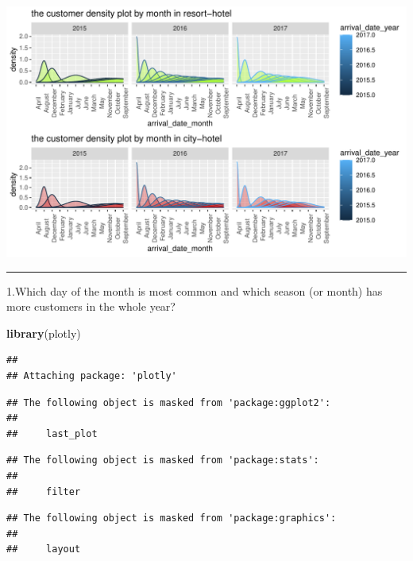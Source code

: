 \documentclass[11pt,a4paper,]{article}
\newenvironment{Shaded}{\begin{snugshade}}{\end{snugshade}}
\newcommand{\KeywordTok}[1]{\textcolor[rgb]{0.13,0.29,0.53}{\textbf{#1}}}
\newcommand{\NormalTok}[1]{#1}
\begin{document}
\includegraphics{tidy_files/figure-latex/unnamed-chunk-12-1.pdf}

\begin{center}\rule{0.5\linewidth}{0.5pt}\end{center}

1.Which day of the month is most common and which season (or month) has more customers in the whole year?

\begin{Shaded}
\begin{Highlighting}[]
\KeywordTok{library}\NormalTok{(plotly)}
\end{Highlighting}
\end{Shaded}

\begin{verbatim}
## 
## Attaching package: 'plotly'
\end{verbatim}

\begin{verbatim}
## The following object is masked from 'package:ggplot2':
## 
##     last_plot
\end{verbatim}

\begin{verbatim}
## The following object is masked from 'package:stats':
## 
##     filter
\end{verbatim}

\begin{verbatim}
## The following object is masked from 'package:graphics':
## 
##     layout
\end{verbatim}
\end{document}
